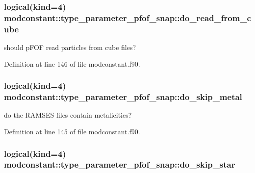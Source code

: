 \subsubsection[{\texorpdfstring{do\+\_\+read\+\_\+from\+\_\+cube}{do_read_from_cube}}]{\setlength{\rightskip}{0pt plus 5cm}logical(kind=4) modconstant\+::type\+\_\+parameter\+\_\+pfof\+\_\+snap\+::do\+\_\+read\+\_\+from\+\_\+cube}\hypertarget{structmodconstant_1_1type__parameter__pfof__snap_a2eda60cfcb05e14b859d4912c4301700}{}\label{structmodconstant_1_1type__parameter__pfof__snap_a2eda60cfcb05e14b859d4912c4301700}


should p\+F\+OF read particles from cube files? 



Definition at line 146 of file modconstant.\+f90.

\subsubsection[{\texorpdfstring{do\+\_\+skip\+\_\+metal}{do_skip_metal}}]{\setlength{\rightskip}{0pt plus 5cm}logical(kind=4) modconstant\+::type\+\_\+parameter\+\_\+pfof\+\_\+snap\+::do\+\_\+skip\+\_\+metal}\hypertarget{structmodconstant_1_1type__parameter__pfof__snap_a348e60587afbd14ddb9a5f03afd4d825}{}\label{structmodconstant_1_1type__parameter__pfof__snap_a348e60587afbd14ddb9a5f03afd4d825}


do the R\+A\+M\+S\+ES files contain metalicities? 



Definition at line 145 of file modconstant.\+f90.

\subsubsection[{\texorpdfstring{do\+\_\+skip\+\_\+star}{do_skip_star}}]{\setlength{\rightskip}{0pt plus 5cm}logical(kind=4) modconstant\+::type\+\_\+parameter\+\_\+pfof\+\_\+snap\+::do\+\_\+skip\+\_\+star}\hypertarget{structmodconstant_1_1type__parameter__pfof__snap_a3d5e01fcda7d62315fe063fd879fca30}{}\label{structmodconstant_1_1type__parameter__pfof__snap_a3d5e01fcda7d62315fe063fd879fca30}



